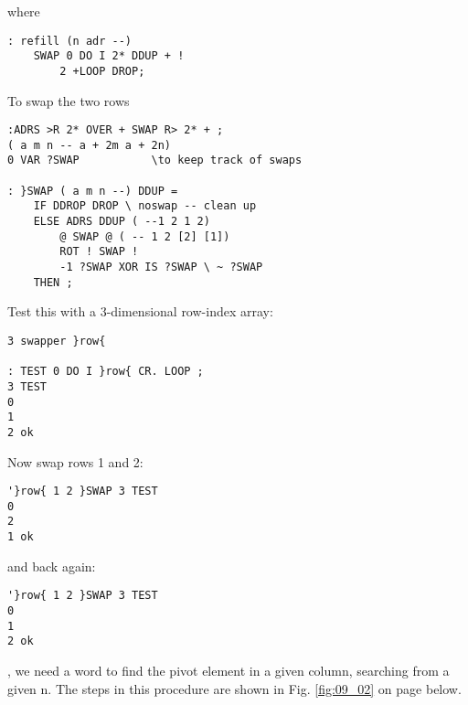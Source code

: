 where

\begin{verbatim}
: refill (n adr --)
    SWAP 0 DO I 2* DDUP + !
        2 +LOOP DROP;
\end{verbatim}

To swap the two rows

\begin{verbatim}
:ADRS >R 2* OVER + SWAP R> 2* + ;
( a m n -- a + 2m a + 2n)
0 VAR ?SWAP           \to keep track of swaps

: }SWAP ( a m n --) DDUP =
    IF DDROP DROP \ noswap -- clean up
    ELSE ADRS DDUP ( --1 2 1 2)
        @ SWAP @ ( -- 1 2 [2] [1])
        ROT ! SWAP !  
        -1 ?SWAP XOR IS ?SWAP \ ~ ?SWAP
    THEN ;
\end{verbatim}

Test this with a 3-dimensional row-index array:

\begin{verbatim}
3 swapper }row{

: TEST 0 DO I }row{ CR. LOOP ;
3 TEST
0
1
2 ok
\end{verbatim}

Now swap rows 1 and 2:

\begin{verbatim}
'}row{ 1 2 }SWAP 3 TEST
0
2
1 ok
\end{verbatim}
and back again:
\begin{verbatim}
'}row{ 1 2 }SWAP 3 TEST
0
1
2 ok
\end{verbatim} 

, we need a word to find the pivot element in a given
column, searching from a given n. The steps in this procedure
are shown in Fig. \ref{fig:09_02} on page \pageref{fig:09_02} below.

